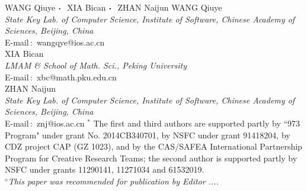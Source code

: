 \documentclass{jssc}
\def\cdd{\mbox{\boldmath$\cdot$}~}
\begin{document}
{WANG Qiuye $\cdd$ XIA Bican $\cdd$ ZHAN Naijun}%
{WANG Qiuye\\
{\it State Key Lab. of Computer Science, Institute of Software, Chinese Academy of Sciences, Beijing, China}\\
E-mail\,$:$ wangqye@ios.ac.cn\\
XIA Bican\\
{\it LMAM \& School of Math. Sci., Peking University}\\
E-mail\,$:$ xbc@math.pku.edu.cn\\
ZHAN Naijun\\
{\it State Key Lab. of Computer Science, Institute of Software, Chinese Academy of Sciences, Beijing, China}\\
E-mail\,$:$ znj@ios.ac.cn}
{$^*$ The first and third authors are supported partly by ``973 Program" under grant No. 2014CB340701, by NSFC under grant 91418204, by CDZ project CAP (GZ 1023), and by the CAS/SAFEA International Partnership Program for Creative Research Teams; 
 the second author is supported partly by NSFC under grants 11290141, 11271034 and 61532019.\\
{$^\diamond${\it This paper was recommended for publication by
Editor .... }}}


\end{document}
